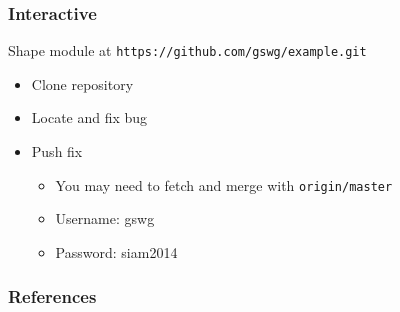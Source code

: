 \documentclass[english,compress]{beamer}
\begin{document}
\begin{frame}[fragile]
    \frametitle{Interactive}

    Shape module at \verb|https://github.com/gswg/example.git|
    \begin{itemize}
        \item Clone repository
        \item Locate and fix bug
        \item Push fix
            \begin{itemize}
                \item You may need to fetch and merge with \verb|origin/master|
                \item Username: gswg
                \item Password: siam2014
            \end{itemize}
    \end{itemize}
\end{frame}

\frame
{
\small
    \frametitle{References}
    \renewcommand{\section}[2]{}
    
    
}
\end{document}
